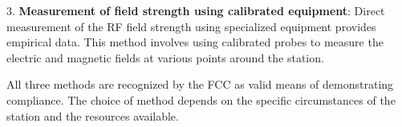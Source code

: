 3. \textbf{Measurement of field strength using calibrated equipment}: Direct measurement of the RF field strength using specialized equipment provides empirical data. This method involves using calibrated probes to measure the electric and magnetic fields at various points around the station.

All three methods are recognized by the FCC as valid means of demonstrating compliance. The choice of method depends on the specific circumstances of the station and the resources available.

